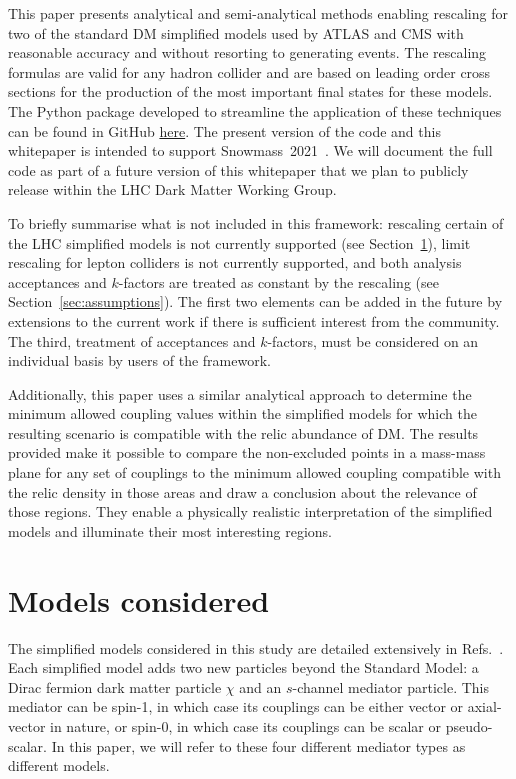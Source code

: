 \documentclass[a4paper, 11pt]{article}
\begin{document}
This paper presents analytical and semi-analytical methods enabling rescaling for two of the standard DM simplified models used by ATLAS and CMS with reasonable accuracy and without resorting to generating events. The rescaling formulas are valid for any hadron collider and are based on leading order cross sections for the production of the most important final states for these models. The Python package developed to streamline the application of these techniques can be found in GitHub \href{https://github.com/LHC-DMWG/DMWG-couplingScan-code}{here}. The present version of the code and this whitepaper is intended to support Snowmass~2021~\cite{snowmass21}. We will document the full code as part of a future version of this whitepaper that we plan to publicly release within the LHC Dark Matter Working Group. 

To briefly summarise what is not included in this framework: rescaling certain of the LHC simplified models is not currently supported (see Section~\ref{sec:models}), limit rescaling for lepton colliders is not currently supported, and both analysis acceptances and $k$-factors are treated as constant by the rescaling (see Section~\ref{sec:assumptions}). The first two elements can be added in the future by extensions to the current work if there is sufficient interest from the community. The third, treatment of acceptances and $k$-factors, must be considered on an individual basis by users of the framework.

Additionally, this paper uses a similar analytical approach to determine the minimum allowed coupling values within the simplified models for which the resulting scenario is compatible with the relic abundance of DM. The results provided make it possible to compare the non-excluded points in a mass-mass plane for any set of couplings to the minimum allowed coupling compatible with the relic density in those areas and draw a conclusion about the relevance of those regions. They enable a physically realistic interpretation of the simplified models and illuminate their most interesting regions.

\section{Models considered}
\label{sec:models}

The simplified models considered in this study are detailed extensively in Refs.~\cite{ABERCROMBIE2020100371,ALBERT2019100377}. Each simplified model adds two new particles beyond the Standard Model: a Dirac fermion dark matter particle $\chi$ and an $s$-channel mediator particle. This mediator can be spin-1, in which case its couplings can be either vector or axial-vector in nature, or spin-0, in which case its couplings can be scalar or pseudo-scalar. In this paper, we will refer to these four different mediator types as different models.
\end{document}
